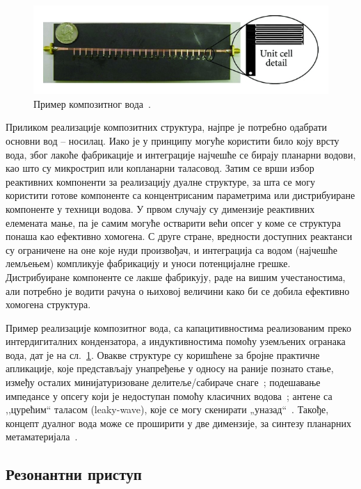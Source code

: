 \begin{figure}[h]
    \centering
    \includegraphics[width=1.0\linewidth]{sl_uvod/crlh_kalo.jpg}
    \caption{Пример композитног вода~\cite{caloz2005}.}
    \label{uvod:crlh_kalo} 
\end{figure}
Приликом реализације композитних структура, најпре је потребно одабрати основни вод – носилац. Иако је у принципу могуће користити било коју врсту вода, због лакоће фабрикације и интеграције најчешће се бирају планарни водови, као што су микрострип или копланарни таласовод. Затим се врши избор реактивних компоненти за реализацију дуалне структуре, за шта се могу користити готове компоненте са концентрисаним параметрима или дистрибуиране компоненте у техници водова. У првом случају су димензије реактивних елемената мање, па је самим могуће остварити већи опсег у коме се структура понаша као ефективно хомогена. С друге стране, вредности доступних реактанси су ограничене на оне које нуди произвођач, и интеграција са водом (најчешће лемљењем) компликује фабрикацију и уноси потенцијалне грешке. Дистрибуиране компоненте се лакше фабрикују, раде на вишим учестаностима, али потребно је водити рачуна о њиховој величини како би се добила ефективно хомогена структура.

Пример реализације композитног вода, са капацитивностима реализованим преко интердигиталних кондензатора, а индуктивностима помоћу уземљених огранака вода, дат је на сл.~\ref{uvod:crlh_kalo}. Овакве структуре су коришћене за бројне практичне апликације, које представљају унапређење у односу на раније познато стање, између осталих минијатуризоване делитеље/сабираче снаге~\cite{caloz2004novel}; подешавање импедансе у опсегу који је недоступан помоћу класичних водова~\cite{damm2007electrically}; антене са ,,цурећим`` таласом (leaky-wave), које се могу скенирати „уназад“~\cite{roig2013liquid}. Такође, концепт дуалног вода може се проширити у две димензије, за синтезу планарних метаматеријала~\cite{grbic2004overcoming,798001}.

\subsection{Резонантни приступ}%

